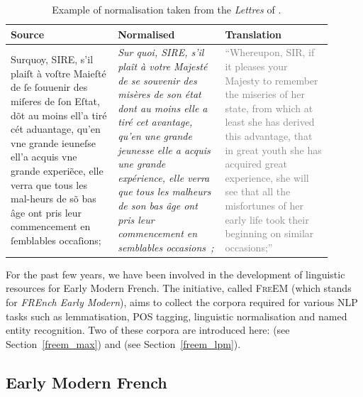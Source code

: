 \begin{table}[!htp]
    \centering\small
    \begin{tabular}{@{}p{0.3\linewidth}p{0.3\linewidth}p{0.3\linewidth}@{}}
        \toprule
        Source                                                                                                                                                                                                                                                                                               & Normalised & Translation \\
        \midrule
        Surquoy, SIRE, s’il plaiſt à voſtre Maieſté de ſe ſouuenir des miſeres de ſon Eſtat, dõt au moins ell’a tiré cét aduantage, qu’en vne grande ieuneſse ell’a acquis vne grande experi\~ece, elle verra que tous les mal-heurs de sõ bas âge ont pris leur commencement en ſemblables occaſions;       &
        \emph{Sur quoi, SIRE, s’il plaît à votre Majesté de se souvenir des misères de son état dont au moins elle a tiré cet avantage, qu’en une grande jeunesse elle a acquis une grande expérience, elle verra que tous les malheurs de son bas âge ont pris leur commencement en semblables occasions~;} &
        \textcolor{gray}{``Whereupon, SIR, if it pleases your Majesty to remember the miseries of her state, from which at least she has derived this advantage, that in great youth she has acquired great experience, she will see that all the misfortunes of her early life took their beginning on similar occasions;''}           \\
        \bottomrule
    \end{tabular}
    \caption{\label{tab:norm_examples}Example of normalisation taken from the \emph{Lettres} of \protect{}.}
\end{table}

For the past few years, we have been involved in the development of linguistic resources for Early Modern French. The initiative, called \textsc{FreEM} (which stands for \emph{FREnch Early Modern}), aims to collect the corpora required for various NLP tasks such as lemmatisation, POS tagging, linguistic normalisation and named entity recognition. Two of these corpora are introduced here: \freemmax (see Section~\ref{freem_max}) and \freemlpm (see Section~\ref{freem_lpm}).

\subsection{Early Modern French}\label{def:early}

